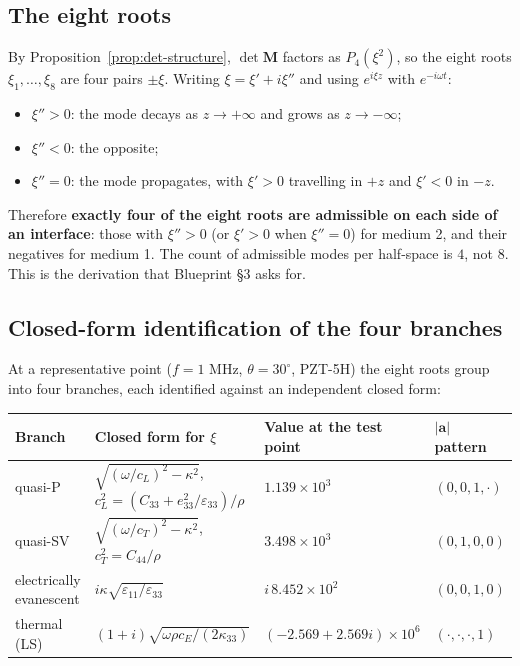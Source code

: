 \documentclass[11pt]{article}
\newcommand{\eps}{\varepsilon}
\theoremstyle{plain}
\begin{document}
\subsection{The eight roots}

By Proposition~\ref{prop:det-structure}, $\det\bm{M}$ factors as $P_4(\xi^2)$, so
the eight roots $\xi_1,\dots,\xi_8$ are four pairs $\pm\xi$. Writing
$\xi = \xi' + i\xi''$ and using $e^{i\xi z}$ with $e^{-i\omega t}$:
\begin{itemize}
  \item $\xi''>0$: the mode decays as $z\to+\infty$ and grows as $z\to-\infty$;
  \item $\xi''<0$: the opposite;
  \item $\xi''=0$: the mode propagates, with $\xi'>0$ travelling in $+z$ and
        $\xi'<0$ in $-z$.
\end{itemize}
Therefore \textbf{exactly four of the eight roots are admissible on each side of an
interface}: those with $\xi''>0$ (or $\xi'>0$ when $\xi''=0$) for medium 2, and
their negatives for medium 1. The count of admissible modes per half-space is
$4$, not $8$. This is the derivation that Blueprint \S3 asks for.

\subsection{Closed-form identification of the four branches}

At a representative point ($f=1$ MHz, $\theta=30^\circ$, PZT-5H) the eight roots
group into four branches, each identified against an independent closed form:

\begin{center}
\begin{tabular}{llll}
\toprule
Branch & Closed form for $\xi$ & Value at the test point & $\lvert\bm{a}\rvert$ pattern \\
\midrule
quasi-P & $\sqrt{(\omega/c_L)^2-\kappa^2}$,
  $c_L^2=(C_{33}+e_{33}^2/\eps_{33})/\rho$ & $1.139\times10^{3}$ & $(0,0,1,\cdot)$ \\
quasi-SV & $\sqrt{(\omega/c_T)^2-\kappa^2}$, $c_T^2=C_{44}/\rho$
  & $3.498\times10^{3}$ & $(0,1,0,0)$ \\
electrically evanescent & $i\kappa\sqrt{\eps_{11}/\eps_{33}}$
  & $i\,8.452\times10^{2}$ & $(0,0,1,0)$ \\
thermal (LS) & $(1+i)\sqrt{\omega\rho c_E/(2\kappa_{33})}$
  & $(-2.569+2.569i)\times10^{6}$ & $(\cdot,\cdot,\cdot,1)$ \\
\bottomrule
\end{tabular}
\end{center}
\end{document}

